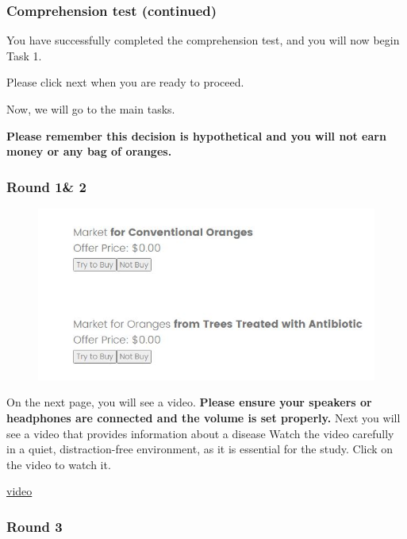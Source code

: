 \documentclass[12pt]{article}
\begin{document}
\clearpage



\subsubsection*{Comprehension test (continued)}

You have successfully completed the comprehension test, and you will now begin Task 1.

 Please click next when you are ready to proceed.

 Now, we will go to the main tasks. 
 
 \textbf{Please remember this decision is hypothetical and you will not earn money or any bag of oranges.}


\clearpage

 \subsubsection*{Round 1\& 2}


 \begin{figure}[H]
    \centering
    \includegraphics[width=0.8\linewidth]{GSO.JPG}
    
    \label{fig:GSO}
\end{figure}

 \vspace{0.5cm}


On the next page, you will see a video. \textbf{Please ensure your speakers or headphones are connected and the volume is set properly.} Next you will see a video that provides information about a disease Watch the video carefully in a quiet, distraction-free environment, as it is essential for the study.
\vspace{0.5cm}
Click on the video to watch it.

\href{https://www.youtube.com/watch?v=_AqMBjB0ChM}{video}
\clearpage


 \subsubsection*{Round 3}
\end{document}
